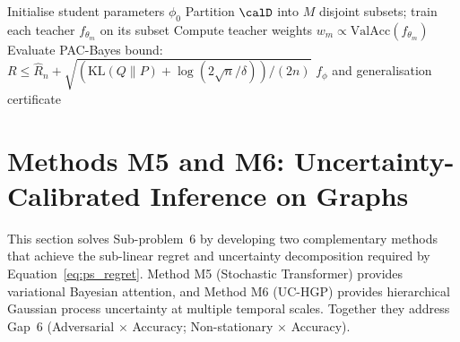 \begin{algorithm}[htbp]
\caption{MambaShield: Training with Progressive Adversarial Robustness Distillation}\label{alg:mamba}
Initialise student parameters $\phi_0$\;
Partition $\calD$ into $M$ disjoint subsets; train each teacher $f_{\theta_m}$ on its subset\;
Compute teacher weights $w_m \propto \mathrm{ValAcc}(f_{\theta_m})$\;
Evaluate PAC-Bayes bound: $R \le \hat{R}_n + \sqrt{(\mathrm{KL}(Q\|P)+\log(2\sqrt{n}/\delta))/(2n)}$\;
\Return $f_\phi$ and generalisation certificate
\end{algorithm}


\section{Methods M5 and M6: Uncertainty-Calibrated Inference on Graphs}
\label{sec:stochastic}

This section solves Sub-problem~6 by developing two complementary methods that achieve the sub-linear regret and uncertainty decomposition required by Equation~\eqref{eq:ps_regret}. Method M5 (Stochastic Transformer) provides variational Bayesian attention, and Method M6 (UC-HGP) provides hierarchical Gaussian process uncertainty at multiple temporal scales. Together they address Gap~6 (Adversarial $\times$ Accuracy; Non-stationary $\times$ Accuracy).

